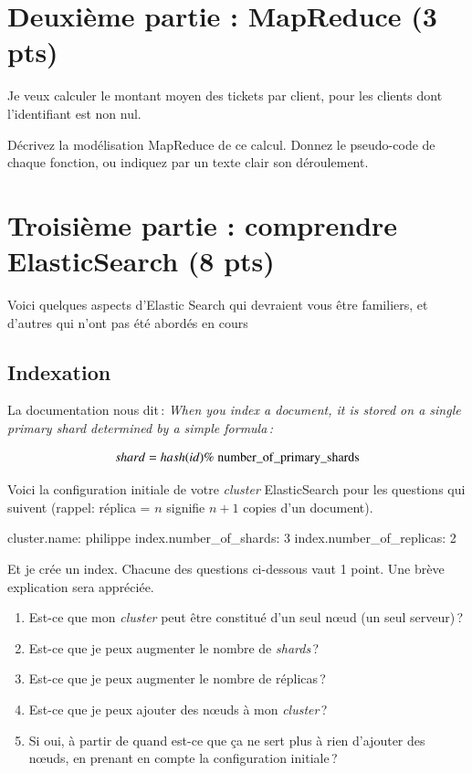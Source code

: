 \documentclass[11pt,a4paper]{article}
\newenvironment{smallverbatim}%
{\endgraf\small\verbatim}{\endverbatim}
\begin{document}
\section*{Deuxième partie : MapReduce (3 pts)}

Je veux calculer le montant moyen des tickets par client, pour les clients dont
 l'identifiant est non nul. 

Décrivez la modélisation MapReduce de ce calcul. 
 Donnez le pseudo-code de chaque
fonction, ou indiquez par un texte clair son déroulement.


\section*{Troisième partie : comprendre ElasticSearch (8 pts)}

Voici quelques aspects d'Elastic Search qui devraient vous être familiers, 
et d'autres qui n'ont pas été abordés en cours

\subsection*{Indexation}

La documentation nous dit\,:
\textit{When you index a document, it is stored on a single primary shard determined by a simple formula\,:}

    $$shard = hash(id) \%\ \rm{number\_of\_primary\_shards}$$
    
Voici la configuration initiale de votre \textit{cluster} ElasticSearch pour les questions qui suivent 
(rappel: réplica = $n$ signifie $n+1$ copies d'un document).

   \begin{smallverbatim}
cluster.name: philippe
index.number_of_shards: 3
index.number_of_replicas: 2
   \end{smallverbatim} 

Et je crée un index. Chacune des questions ci-dessous vaut 1 point. Une brève explication sera appréciée.

\begin{enumerate}
       \item Est-ce que mon \textit{cluster} peut être constitué d'un seul n{\oe}ud (un seul serveur)\,?
       \item Est-ce que je peux augmenter le nombre de \textit{shards}\,?
       \item Est-ce que je peux augmenter le nombre de réplicas\,?
       \item Est-ce que je peux ajouter des n{\oe}uds à mon \textit{cluster}\,?
       \item Si oui, à partir de quand est-ce que ça ne sert plus à rien d'ajouter des n{\oe}uds, en prenant
            en compte la configuration initiale\,?
    \end{enumerate}
\end{document}
